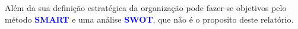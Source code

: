 {Além da sua definição estratégica da organização pode fazer-se objetivos pelo método \textcolor{blue}{\textbf{SMART}} e uma análise \textcolor{blue}{\textbf{SWOT}}, que não é o proposito deste relatório.\\


}
